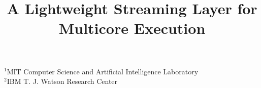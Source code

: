 %
%
%
%
%
%
%
%
%
%
%
%
%
% 
% 
\title{A Lightweight Streaming Layer for Multicore Execution}

           {$^1$MIT Computer Science and Artificial Intelligence Laboratory\\
            $^2$IBM T. J. Watson Research Center}
           {}
\maketitle

